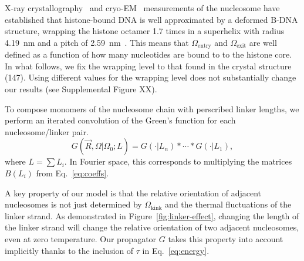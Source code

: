 \documentclass[%
 reprint,
superscriptaddress,
showpacs,preprintnumbers,
 amsmath,amssymb,
 aps,
 prl,
]{revtex4-1}
\newcommand{\greens}[2][\Omega_0; L]{G(#2|#1)}
\begin{document}
X-ray crystallography~\cite{white2001,richmond2003,cutter2015a} and
    cryo-EM~\cite{bednar2017,bilokapic2018,eltsov2018,wakamori2015,zhou2015}
    measurements of the nucleosome have established that histone-bound DNA is
    well approximated by a deformed B-DNA structure, wrapping the histone
    octamer 1.7 times in a superhelix with radius \SI{4.19}{\nano\metre} and a
    pitch of \SI{2.59}{\nano\metre}~\cite{richmond2003}.
This means that $\Omega_\text{entry}$ and $\Omega_\text{exit}$ are well defined as a
    function of how many nucleotides are bound to to the histone core.
In what follows, we fix the wrapping level to that found in the crystal
    structure (\SI{147}{\basepair}).
Using different values for the wrapping level does not substantially change our
    results (see Supplemental Figure XX).

To compose monomers of the nucleosome chain with perscribed linker lengths, we
    perform an iterated convolution of the Green's function for each
    nucleosome/linker pair.
\begin{equation}\label{eq:conv}
    \greens{\vec{R},\Omega} = \greens[L_n]{\cdot} * \cdots{} * \greens[L_1]{\cdot},
\end{equation}
    where $L = \sum L_i$.
In Fourier space, this corresponds to multiplying the matrices $B(L_i)$
    from Eq.~\ref{eq:coeffs}.


A key property of our model is that the relative orientation of adjacent
    nucleosomes is not just determined by $\Omega_\text{kink}$ and the thermal
    fluctuations of the linker strand.
As demonstrated in Figure~\ref{fig:linker-effect}, changing the length of the
    linker strand will change the relative orientation of two adjacent
    nucleosomes, even at zero temperature.
Our propagator $G$ takes this property into account implicitly thanks to the
    inclusion of $\tau$ in Eq.~\ref{eq:energy}.
\end{document}
